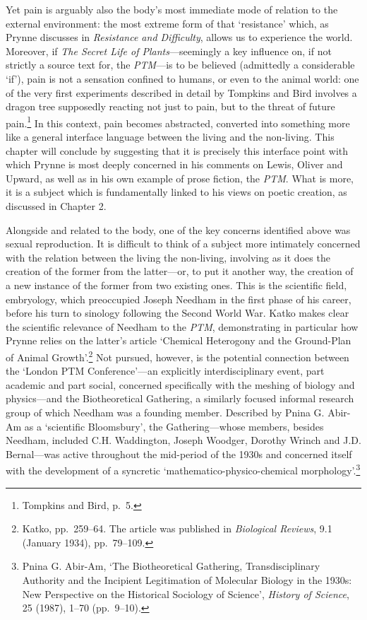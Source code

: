 \documentclass[]{article}
\begin{document}
\noindent Yet pain is arguably also the body's most immediate mode of
relation to the external environment: the most extreme form of that
`resistance' which, as Prynne discusses in \emph{Resistance and
Difficulty}, allows us to experience the world. Moreover, if \emph{The
Secret Life of Plants}---seemingly a key influence on, if not strictly a
source text for, the \emph{PTM}---is to be believed (admittedly a
considerable `if'), pain is not a sensation confined to humans, or even
to the animal world: one of the very first experiments described in
detail by Tompkins and Bird involves a dragon tree supposedly reacting
not just to pain, but to the threat of future pain.\footnote{Tompkins
  and Bird, p.~5.} In this context, pain becomes abstracted, converted
into something more like a general interface language between the living
and the non-living. This chapter will conclude by suggesting that it is
precisely this interface point with which Prynne is most deeply
concerned in his comments on Lewis, Oliver and Upward, as well as in his
own example of prose fiction, the \emph{PTM}. What is more, it is a
subject which is fundamentally linked to his views on poetic creation,
as discussed in Chapter 2.

Alongside and related to the body, one of the key concerns identified
above was sexual reproduction. It is difficult to think of a subject
more intimately concerned with the relation between the living the
non-living, involving as it does the creation of the former from the
latter---or, to put it another way, the creation of a new instance of
the former from two existing ones. This is the scientific field,
embryology, which preoccupied Joseph Needham in the first phase of his
career, before his turn to sinology following the Second World War.
Katko makes clear the scientific relevance of Needham to the \emph{PTM},
demonstrating in particular how Prynne relies on the latter's article
`Chemical Heterogony and the Ground-Plan of Animal Growth'.\footnote{Katko,
  pp.~259--64. The article was published in \emph{Biological Reviews},
  9.1 (January 1934), pp.~79--109.} Not pursued, however, is the
potential connection between the `London PTM Conference'---an explicitly
interdisciplinary event, part academic and part social, concerned
specifically with the meshing of biology and physics---and the
Biotheoretical Gathering, a similarly focused informal research group of
which Needham was a founding member. Described by Pnina G. Abir-Am as a
`scientific Bloomsbury', the Gathering---whose members, besides Needham,
included C.H. Waddington, Joseph Woodger, Dorothy Wrinch and J.D.
Bernal---was active throughout the mid-period of the 1930s and concerned
itself with the development of a syncretic `mathematico-physico-chemical
morphology'.\footnote{Pnina G. Abir-Am, `The Biotheoretical Gathering,
  Transdisciplinary Authority and the Incipient Legitimation of
  Molecular Biology in the 1930s: New Perspective on the Historical
  Sociology of Science', \emph{History of Science}, 25 (1987), 1--70
  (pp.~9--10).}
\end{document}
